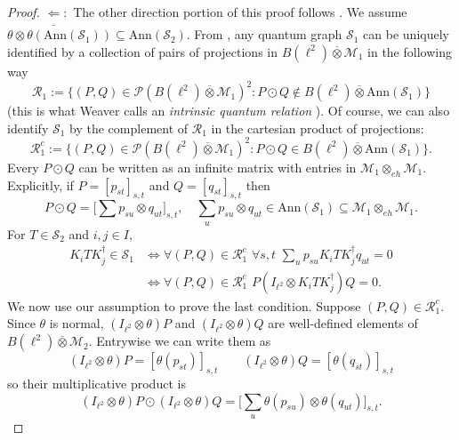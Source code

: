 \documentclass[12pt]{article}
\theoremstyle{definition}
\newcommand{\mc}[1]{\mathcal{#1}}
\newcommand{\<}{\langle}
\renewcommand{\>}{\rangle}
\newcommand{\Ann}{\text{Ann}}
\renewcommand{\hat}[1]{\widehat{#1}}
\newcommand{\eh}{\otimes_{eh}}
\begin{document}
\begin{proof}
    $\underline{\Longleftarrow}:$ The other direction portion of this proof follows \cite[Theorem 8.4]{weavergraphsrelations}. We assume $\theta \otimes \theta(\Ann(\mc S_1)) \subseteq \Ann(\mc S_2)$. From \cite[Theorem 3.3]{gp-obs}, any quantum graph $\mc S_1$ can be uniquely identified by a collection of pairs of projections in $B(\ell^2) \overline{\otimes} \mc M_1$ in the following way
    \[
    \mc R_1 := \{(P,Q) \in \mc P(B(\ell^2) \overline{\otimes} \mc M_1)^2 : P \odot Q \notin B(\ell^2) \overline{\otimes} \Ann(\mc S_1)\}
    \]
    (this is what Weaver calls an \textit{intrinsic quantum relation} \cite[Definition 2.24]{weaverqrelations}). Of course, we can also identify $\mc S_1$ by the complement of $\mc R_1$ in the cartesian product of projections:
    \[
    \mc R_1^c := \{(P,Q) \in \mc P(B(\ell^2) \overline{\otimes} \mc M_1)^2 : P \odot Q \in B(\ell^2) \overline{\otimes} \Ann(\mc S_1)\}.
    \]
    Every $P \odot Q$ can be written as an infinite matrix with entries in $\mc M_1 \eh \mc M_1$. Explicitly, if $P = [p_{st}]_{s,t}$ and $Q = [q_{st}]_{s,t}$ then
    \[
    P \odot Q = \bigg[ \sum_{} p_{su} \otimes q_{ut} \bigg]_{s,t}, \quad \sum_u p_{su} \otimes q_{ut} \in \Ann(\mc S_1) \subseteq  \mc M_1 \eh \mc M_1.
    \]
    For $T \in \mc S_2$ and $i,j \in I$, 
    \begin{align*}
     K_i T K_j^\dagger \in \mc S_1 &\iff \forall (P,Q) \in \mc R_1^c \, \, \forall s,t  \, \,\sum_u p_{su} K_i T K_j^\dagger q_{ut} = 0 \\
     &\iff  \forall (P,Q) \in \mc R_1^c  \, \, P(I_{\ell^2} \otimes K_iTK_j^\dagger) Q  = 0.
    \end{align*}
    We now use our assumption to prove the last condition. Suppose $(P,Q) \in \mc R_1^c$. Since $\theta$ is normal, $(I_{\ell^2} \otimes \theta)P$ and $(I_{\ell^2} \otimes \theta)Q$ are well-defined elements of $B(\ell^2) \overline{\otimes} \mc M_2$. %
    Entrywise we can write them as
    \[
    (I_{\ell^2} \otimes \theta)P = [\theta(p_{st})]_{s,t} \qquad (I_{\ell^2} \otimes \theta)Q = [\theta(q_{st})]_{s,t}
    \]
    so their multiplicative product is
    \[
    (I_{\ell^2} \otimes \theta)P \odot(I_{\ell^2} \otimes \theta)Q =  \bigg[ \sum_u \theta(p_{su}) \otimes \theta(q_{ut}) \bigg]_{s,t}.
\]
\end{proof}
\end{document}
